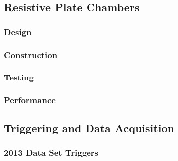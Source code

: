 \subsection{Resistive Plate Chambers}
\subsubsection{Design}
\subsubsection{Construction}
\subsubsection{Testing}
\subsubsection{Performance}
\subsection{Triggering and Data Acquisition}
\subsubsection{2013 Data Set Triggers}
